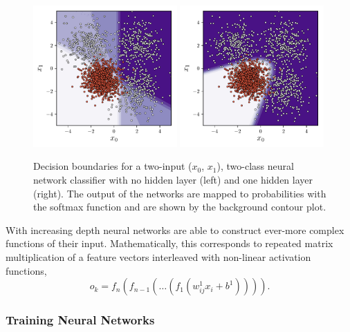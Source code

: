 \begin{figure}[h!]
    \begin{center}
        \includegraphics[width=0.49\textwidth]{figures/machine_learning/decision_bound_tanh_depth_1.pdf}
        \includegraphics[width=0.49\textwidth]{figures/machine_learning/decision_bound_tanh_depth_2.pdf}
    \end{center}
    \caption{Decision boundaries for a two-input ($x_{0}$, $x_{1}$), two-class neural network classifier with no hidden layer (left) and one hidden layer (right). The output of the networks are mapped to probabilities with the softmax function and are shown by the background contour plot. }
        \label{fig:machine_learning:mlp_example}
\end{figure}
With increasing depth neural networks are able to construct ever-more complex functions of their input. 
Mathematically, this corresponds to repeated matrix multiplication of a feature vectors interleaved with non-linear activation functions,
\begin{equation}
    o_{k} = f_{n}(f_{n-1}(\dots{}(f_{1}(w^{1}_{ij}x_{i} + b^{1})))).
\end{equation}



\subsubsection{Training Neural Networks}

